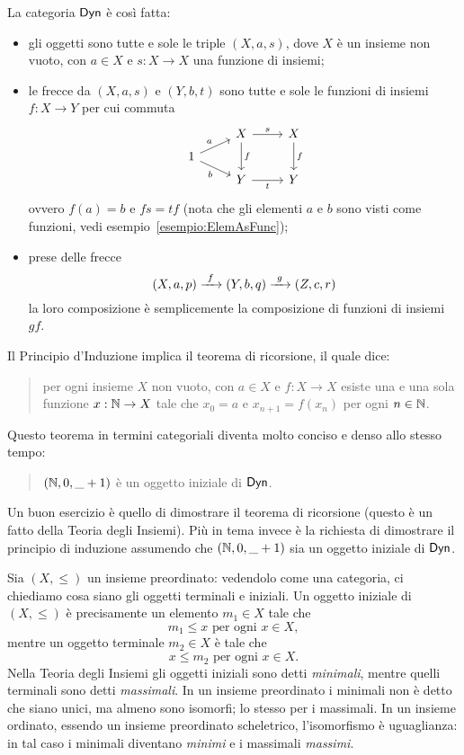 \begin{esercizio}
La categoria \(\mathsf{Dyn}\) è così fatta:
\begin{itemize}
\item gli oggetti sono tutte e sole le triple \((X, a, s)\), dove \(X\) è un insieme non vuoto, con \(a \in X\) e \(s : X \to X\) una funzione di insiemi;
%
\item le frecce da \((X, a, s)\) e \((Y, b, t)\) sono tutte e sole le funzioni di insiemi \(f : X \to Y\) per cui commuta
\[\begin{tikzcd}[row sep = tiny]
& X \ar["s", r] \ar["f", dd] & X \ar["f", dd] \\
1 \ar["a", ur] \ar["b", dr, swap] \\
& Y \ar["t", r, swap]             & Y
\end{tikzcd}\]
ovvero \(f(a) = b\) e \(fs = tf\) (nota che gli elementi \(a\) e \(b\) sono visti come funzioni, vedi esempio~\ref{esempio:ElemAsFunc});
%
\item prese delle frecce
\[(X, a, p) \xrightarrow{\ f\ } (Y, b, q) \xrightarrow{\ g\ } (Z, c, r)\]
la loro composizione è semplicemente la composizione di funzioni di insiemi \(gf\). 
\end{itemize}
%
Il Principio d'Induzione implica il teorema di ricorsione, il quale dice:
\begin{quotation}
per ogni insieme \(X\) non vuoto, con \(a \in X\) e \(f : X \to X\) esiste una e una sola funzione \(x : \mathbb N \to X\) tale che \(x_0 = a\) e \(x_{n+1} = f(x_n)\) per ogni \(n \in \mathbb N\).
\end{quotation}
Questo teorema in termini categoriali diventa molto conciso e denso allo stesso tempo:
\begin{quotation}
\((\mathbb N, 0, \_+1)\) è un oggetto iniziale di \(\mathsf{Dyn}\).
\end{quotation}
Un buon esercizio è quello di dimostrare il teorema di ricorsione (questo è un fatto della Teoria degli Insiemi). Più in tema invece è la richiesta di dimostrare il principio di induzione assumendo che \((\mathbb N, 0, \_+1)\) sia un oggetto iniziale di \(\mathsf{Dyn}\).
\end{esercizio}

\begin{esempio}
Sia \((X, \leqslant)\) un insieme preordinato: vedendolo come una categoria, ci chiediamo cosa siano gli oggetti terminali e iniziali. Un oggetto iniziale di \((X, \leqslant)\) è precisamente un elemento \(m_1 \in X\) tale che
\[m_1 \leqslant x \text{ per ogni } x \in X,\]
mentre un oggetto terminale \(m_2 \in X\) è tale che
\[x \leqslant m_2 \text{ per ogni } x \in X.\]
Nella Teoria degli Insiemi gli oggetti iniziali sono detti {\em minimali}, mentre quelli terminali sono detti {\em massimali}.\newline
In un insieme preordinato i minimali non è detto che siano unici, ma almeno sono isomorfi; lo stesso per i massimali. In un insieme ordinato, essendo un insieme preordinato scheletrico, l'isomorfismo è uguaglianza: in tal caso i minimali diventano {\em minimi} e i massimali {\em massimi}.
\end{esempio}

